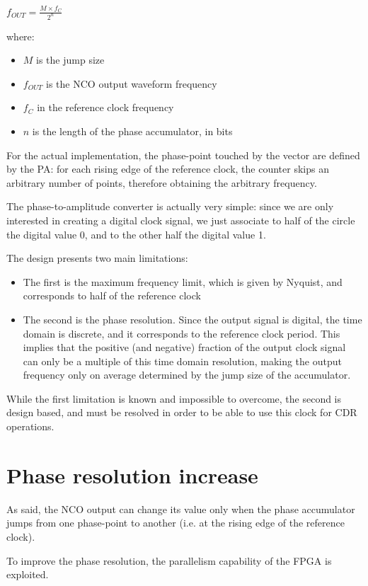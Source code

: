\documentclass[letterpaper,10pt,english,openany,oneside]{sphinxmanual}
\begin{document}
\(f_{OUT} = \frac{M \times f_C}{2^n}\)

where:
\begin{itemize}
\item {} 
\(M\) is the jump size

\item {} 
\(f_{OUT}\) is the NCO output waveform frequency

\item {} 
\(f_C\) in the reference clock frequency

\item {} 
\(n\) is the length of the phase accumulator, in bits

\end{itemize}

\begin{DUlineblock}{0em}
\item[] For the actual implementation, the phase-point touched by the vector are defined by the PA: for each rising edge of the reference clock, the counter skips an arbitrary number of points, therefore obtaining the arbitrary frequency.
\item[] The phase-to-amplitude converter is actually very simple: since we are only interested in creating a digital clock signal, we just associate to half of the circle the digital value 0, and to the other half the digital value 1.
\end{DUlineblock}

The design presents two main limitations:
\begin{itemize}
\item {} 
The first is the maximum frequency limit, which is given by Nyquist, and corresponds to half of the reference clock

\item {} 
The second is the phase resolution. Since the output signal is digital, the time domain is discrete, and it corresponds to the reference clock period. This implies that the positive (and negative) fraction of the output clock signal can only be a multiple of this time domain resolution, making the output frequency only on average determined by the jump size of the accumulator.

\end{itemize}

While the first limitation is known and impossible to overcome, the second is design based, and must be resolved in order to be able to use this clock for CDR operations.


\section{Phase resolution increase}
\label{\detokenize{paper/nco:phase-resolution-increase}}
\begin{DUlineblock}{0em}
\item[] As said, the NCO output can change its value only when the phase accumulator jumps from one phase-point to another (i.e. at the rising edge of the reference clock).
\item[] To improve the phase resolution, the parallelism capability of the FPGA is exploited.
\end{DUlineblock}
\end{document}
